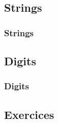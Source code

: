 \documentclass{beamer}
\begin{document}
\fi

\subsection{Strings}

\begin{frame}%
\frametitle{Strings}

\end{frame}

\subsection{Digits}

\begin{frame}%
\frametitle{Digits}

\end{frame}

\subsection{Exercices}
\end{document}
